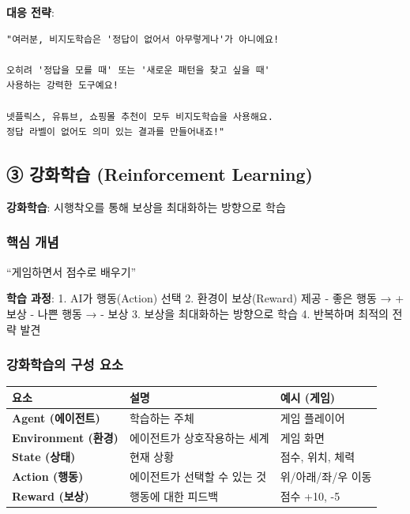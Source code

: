 \documentclass[a4paper, 11pt]{article}
\renewenvironment{quote}
  {\begin{tcolorbox}[colback=lightblue!30, colframe=mainblue!50,
   left=8pt, right=8pt, top=4pt, bottom=4pt, breakable]}
  {\end{tcolorbox}}
\begin{document}
\textbf{대응 전략}:

\begin{verbatim}
"여러분, 비지도학습은 '정답이 없어서 아무렇게나'가 아니에요!

오히려 '정답을 모를 때' 또는 '새로운 패턴을 찾고 싶을 때'
사용하는 강력한 도구예요!

넷플릭스, 유튜브, 쇼핑몰 추천이 모두 비지도학습을 사용해요.
정답 라벨이 없어도 의미 있는 결과를 만들어내죠!"
\end{verbatim}

\hypertarget{uxac15uxd654uxd559uxc2b5-reinforcement-learning}{%
\subsection{\textbf{③} 강화학습 (Reinforcement
Learning)}\label{uxac15uxd654uxd559uxc2b5-reinforcement-learning}}

\begin{quote}
\textbf{강화학습}: 시행착오를 통해 보상을 최대화하는 방향으로 학습
\end{quote}

\hypertarget{uxd575uxc2ec-uxac1cuxb150-1}{%
\subsubsection{핵심 개념}\label{uxd575uxc2ec-uxac1cuxb150-1}}

``게임하면서 점수로 배우기''

\textbf{학습 과정}: 1. AI가 행동(Action) 선택 2. 환경이 보상(Reward)
제공 - 좋은 행동 → + 보상 - 나쁜 행동 → - 보상 3. 보상을 최대화하는
방향으로 학습 4. 반복하며 최적의 전략 발견

\hypertarget{uxac15uxd654uxd559uxc2b5uxc758-uxad6cuxc131-uxc694uxc18c}{%
\subsubsection{강화학습의 구성
요소}\label{uxac15uxd654uxd559uxc2b5uxc758-uxad6cuxc131-uxc694uxc18c}}

\begin{longtable}{p{4.5cm}p{4.5cm}p{5.0cm}}
\toprule\noalign{}
\textbf{요소} & \textbf{설명} & \textbf{예시 (게임)} \\
\midrule\noalign{}
\endhead
\bottomrule\noalign{}
\endlastfoot
\textbf{Agent (에이전트)} & 학습하는 주체 & 게임 플레이어 \\
\textbf{Environment (환경)} & 에이전트가 상호작용하는 세계 & 게임
화면 \\
\textbf{State (상태)} & 현재 상황 & 점수, 위치, 체력 \\
\textbf{Action (행동)} & 에이전트가 선택할 수 있는 것 & 위/아래/좌/우
이동 \\
\textbf{Reward (보상)} & 행동에 대한 피드백 & 점수 +10, -5 \\
\end{longtable}
\end{document}
